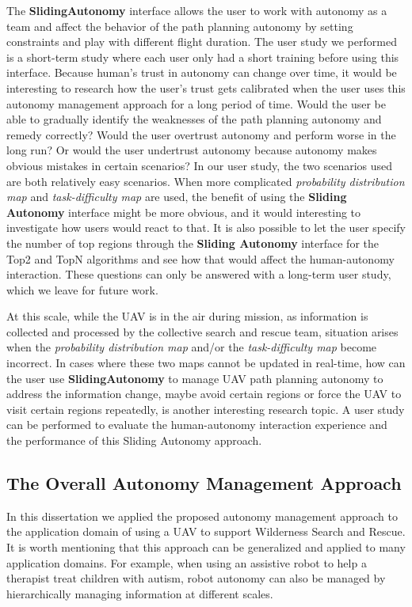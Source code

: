 The \textbf{SlidingAutonomy} interface allows the user to work with autonomy as a team and affect the behavior of the path planning autonomy by setting constraints and play with different flight duration. The user study we performed is a short-term study where each user only had a short training before using this interface. Because human's trust in autonomy can change over time, it would be interesting to research how the user's trust gets calibrated when the user uses this autonomy management approach for a long period of time. Would the user be able to gradually identify the weaknesses of the path planning autonomy and remedy correctly? Would the user overtrust autonomy and perform worse in the long run? Or would the user undertrust autonomy because autonomy makes obvious mistakes in certain scenarios? In our user study, the two scenarios used are both relatively easy scenarios. When more complicated \textit{probability distribution map} and \textit{task-difficulty map} are used, the benefit of using the \textbf{Sliding Autonomy} interface might be more obvious, and it would interesting to investigate how users would react to that. It is also possible to let the user specify the number of top regions through the \textbf{Sliding Autonomy} interface for the Top2 and TopN algorithms and see how that would affect the human-autonomy interaction. These questions can only be answered with a long-term user study, which we leave for future work.

At this scale, while the UAV is in the air during mission, as information is collected and processed by the collective search and rescue team, situation arises when the \textit{probability distribution map} and/or the \textit{task-difficulty map} become incorrect. In cases where these two maps cannot be updated in real-time, how can the user use \textbf{SlidingAutonomy} to manage UAV path planning autonomy to address the information change, maybe avoid certain regions or force the UAV to visit certain regions repeatedly, is another interesting research topic. A user study can be performed to evaluate the human-autonomy interaction experience and the performance of this Sliding Autonomy approach.


\subsection{The Overall Autonomy Management Approach}

In this dissertation we applied the proposed autonomy management approach to the application domain of using a UAV to support Wilderness Search and Rescue. It is worth mentioning that this approach can be generalized and applied to many application domains. For example, when using an assistive robot to help a therapist treat children with autism, robot autonomy can also be managed by hierarchically managing information at different scales. 

